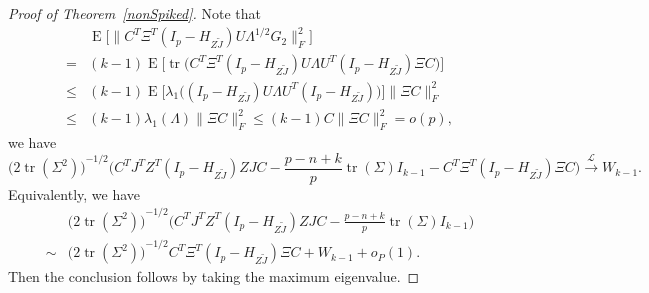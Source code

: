 \documentclass[review]{elsarticle}
\DeclareMathOperator{\mytr}{tr}
\DeclareMathOperator{\myE}{E}
\theoremstyle{plain}
\theoremstyle{definition}
\theoremstyle{remark}
\begin{document}
\begin{proof}[\textrm{Proof of Theorem~\ref{nonSpiked}}]
    Note that
    $$
    \begin{aligned}
        &\myE\big[\| C^T \Xi^T (I_p-H_{Z\tilde{J}})U\Lambda^{1/2}G_2\|_F^2\big]\\
        = &
        (k-1)\myE \big[\mytr\big(
        C^T \Xi^T (I_p-H_{Z\tilde{J}})U\Lambda U^T (I_p-H_{Z\tilde{J}})\Xi C
        \big)\big]\\
        \leq &
        (k-1)\myE \big[\lambda_1\big(
         (I_p-H_{Z\tilde{J}})U\Lambda U^T (I_p-H_{Z\tilde{J}})
        \big)\big]
        \|\Xi C\|_F^2\\
        \leq &
        (k-1)\lambda_1(\Lambda)\|\Xi C\|_F^2
        \leq 
        (k-1)C\|\Xi C\|_F^2=o(p),
    \end{aligned}
    $$
    we have
    $$
    {\Big(2\mytr (\Sigma^2)\Big)}^{-1/2}{\Big(C^TJ^T Z^T(I_p-H_{Z\tilde J}) ZJC- \frac{p-n+k}{p}\mytr(\Sigma)I_{k-1}-C^T \Xi^T (I_p-H_{Z\tilde{J}})\Xi C}\Big)
    \xrightarrow{\mathcal{L}}W_{k-1}.
    $$
    Equivalently, we have
    $$
    \begin{aligned}
        &{\Big(2\mytr (\Sigma^2)\Big)}^{-1/2}{\Big(C^TJ^T Z^T(I_p-H_{Z\tilde J}) ZJC- \frac{p-n+k}{p}\mytr(\Sigma)I_{k-1}}\Big)\\
        \sim&
        {\Big(2\mytr (\Sigma^2)\Big)}^{-1/2} C^T \Xi^T (I_p-H_{Z\tilde{J}})\Xi C
        +W_{k-1}+o_P(1).
    \end{aligned}
    $$
    Then the conclusion follows by taking the maximum eigenvalue.
\end{proof}
\end{document}
